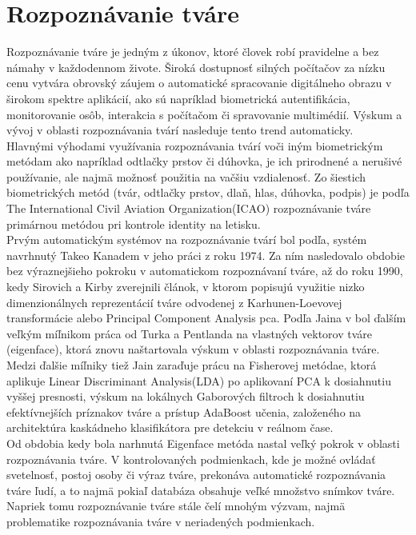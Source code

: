 \section{Rozpoznávanie tváre}
Rozpoznávanie tváre je jedným z úkonov, ktoré človek robí pravidelne a bez námahy v každodennom živote.
Široká dostupnosť silných počítačov za nízku cenu vytvára obrovský záujem o automatické spracovanie digitálneho
obrazu v širokom spektre aplikácií, ako sú napríklad biometrická autentifikácia, monitorovanie osôb,
interakcia s počítačom či spravovanie multimédií.
Výskum a vývoj v oblasti rozpoznávania tvárí nasleduje tento trend
automaticky.\\
\indent Hlavnými výhodami využívania rozpoznávania tvárí voči iným biometrickým metódam ako napríklad odtlačky prstov či dúhovka,
je ich prirodnené a nerušivé používanie, ale najmä možnosť použitia na vačšiu vzdialenosť. Zo šiestich biometrických metód (tvár, odtlačky prstov, dlaň, hlas, dúhovka, podpis)
je podľa The International Civil Aviation Organization(ICAO)\cite{icao} rozpoznávanie tváre primárnou metódou pri kontrole identity na letisku.\\
\indent Prvým automatickým systémov na rozpoznávanie tvárí bol podľa\cite{handbookface}, systém navrhnutý Takeo Kanadem v jeho práci\cite{kanade1974} z roku 1974.
Za ním nasledovalo obdobie bez výraznejšieho pokroku v automatickom rozpoznávaní tváre, až do roku 1990, kedy Sirovich a Kirby zverejnili článok\cite{kirby1990application},
v ktorom popisujú využitie nizko dimenzionálnych reprezentácií tváre odvodenej z Karhunen-Loevovej transformácie alebo Principal Component Analysis \acrshort{pca}.
Podľa Jaina v\cite{handbookface} bol ďalším veľkým míľnikom práca\cite{turk1991eigenfaces} od Turka a Pentlanda na vlastných vektorov tváre (eigenface),
ktorá znovu naštartovala výskum v oblasti rozpoznávania tváre. Medzi ďalšie míľniky tiež Jain zaraďuje prácu na Fisherovej metódae\cite{belhumeur1997eigenfaces},
ktorá aplikuje Linear Discriminant Analysis(LDA) po aplikovaní PCA k dosiahnutiu vyššej presnosti, výskum na lokálnych Gaborových filtroch\cite{wiskott1997face}
k dosiahnutiu efektívnejších príznakov tváre a prístup AdaBoost učenia, založeného na architektúra kaskádneho klasifikátora pre detekciu v reálnom čase\cite{viola2001rapid}.\\
\indent Od obdobia kedy bola narhnutá Eigenface metóda nastal veľký pokrok v oblasti rozpoznávania tváre.
V kontrolovaných podmienkach, kde je možné ovládať svetelnosť,
postoj osoby či výraz tváre, prekonáva automatické rozpoznávania tváre ľudí, a to najmä pokiaľ databáza obsahuje veľké množstvo snímkov tváre.
Napriek tomu rozpoznávanie tváre
stále čelí mnohým výzvam, najmä problematike rozpoznávania tváre v neriadených podmienkach.

